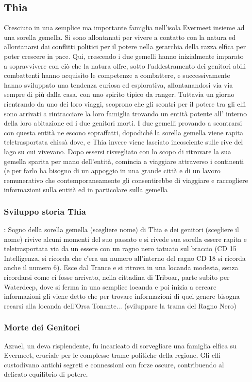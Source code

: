 \documentclass{article}
\begin{document}
\subsection{Thia}
Cresciuto in una semplice ma importante famiglia nell'isola Evermeet insieme ad una sorella gemella. Si sono allontanati per vivere a contatto con la natura ed allontanarsi dai conflitti politici per il potere nella gerarchia della razza elfica per poter crescere in pace. Qui, crescendo i due gemelli hanno inizialmente imparato a sopravvivere con ciò che la natura offre, sotto l'addestramento dei genitori abili combattenti hanno acquisito le competenze a combattere, e successivamente hanno sviluppato una tendenza curiosa ed esplorativa, allontanandosi via via sempre di più dalla casa, con uno spirito tipico da ranger. Tuttavia un giorno rientrando da uno dei loro viaggi, scoprono che gli scontri per il potere tra gli elfi sono arrivati a rintracciare la loro famiglia trovando un entità potente all' interno della loro abitazione ed i due genitori morti. I due gemelli provando a scontrarsi con questa entità ne escono sopraffatti, dopodiché la sorella gemella viene rapita teletrasportata chissà dove, e Thia invece viene lasciato incosciente sulle rive del lago su cui vivevano. Dopo essersi risvegliato con lo scopo di ritrovare la sua gemella sparita per mano dell'entità, comincia a viaggiare attraverso i continenti (e per farlo ha bisogno di un appoggio in una grande città e di un lavoro remunerativo che contemporaneamente gli consentirebbe di viaggiare e raccogliere informazioni sulla entità ed in particolare sulla gemella
 \subsubsection{Sviluppo storia Thia}: Sogno della sorella gemella (scegliere nome) di Thia e dei genitori (scegliere il nome) rivive alcuni momenti del suo passato e si rivede sua sorella essere rapita e teletrasportata via da un essere con un ragno nero tatuato sul braccio (CD 15 Intelligenza, si ricorda che c'era un numero all'interno del ragno CD 18 si ricorda anche il numero 6). Esce dal Trance e si ritrova in una locanda modesta, senza ricordarsi come ci fosse arrivato, nella cittadina di  Triboar, parte subito per Waterdeep, dove si ferma in una semplice locanda e poi inizia a cercare informazioni gli viene detto che per trovare informazioni di quel genere bisogna recarsi alla locanda dell'Orsa Tonante... (sviluppare la trama del Ragno Nero)
 \subsubsection{Morte dei Genitori}Azrael, un deva risplendente, fu incaricato di sorvegliare una famiglia elfica su Evermeet, cruciale per le complesse trame politiche della regione. Gli elfi custodivano antichi segreti e connessioni con forze oscure, contribuendo al delicato equilibrio di potere.
\end{document}
